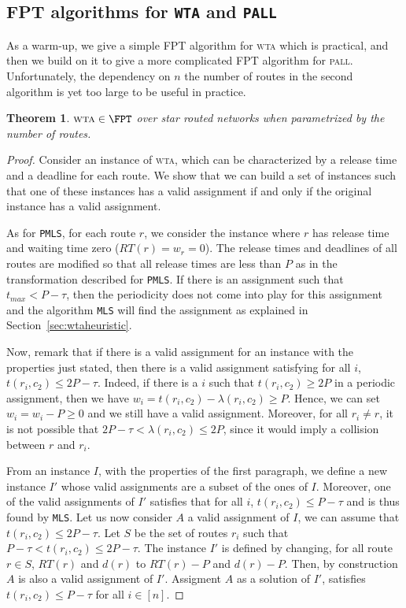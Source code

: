 \documentclass[a4paper,10pt]{article}
\newcommand\MLS{\texttt{MLS}\xspace}
\newcommand\PMLS{\texttt{PMLS}\xspace}
\newtheorem{theorem}{Theorem}
\newcommand\pall{\textsc{pall}\xspace}
\newcommand\wta{\textsc{wta}\xspace}
\begin{document}
\subsection{FPT algorithms for \texttt{WTA} and \texttt{PALL}}

As a warm-up, we give a simple FPT algorithm for \wta which is practical,
and then we build on it to give a more complicated FPT algorithm for \pall. Unfortunately, the dependency on $n$ the number of routes in the second algorithm is yet too large to be useful in practice. 

\begin{theorem}\label{th:braFPT}
$\wta \in \FPT$ over star routed networks when parametrized by the number of routes.
\end{theorem}
\begin{proof}
 Consider an instance of \wta, which can be characterized by a release time and a deadline for each route.
 We show that we can build a set of instances such that one of these instances has a valid assignment if and only if the original instance has a valid assignment.

  As for \PMLS, for each route $r$, we consider the instance where $r$ has release time and waiting time zero ($RT(r) = w_r = 0$). The release times and deadlines of all routes are modified so that all release times are less than $P$ as in the transformation described for \PMLS. If there is an assignment such that $t_{max} < P-\tau$, then the periodicity does not come into play for this assignment and the algorithm \MLS will find the assignment as explained in Section~\ref{sec:wtaheuristic}.

 Now, remark that if there is a valid assignment for an instance with the properties just stated,
 then there is a valid assignment satisfying for all $i$, $t(r_i,c_2) \leq 2P - \tau$.  
 Indeed, if there is a $i$ such that $t(r_i,c_2) \geq 2P$ in a periodic assignment, then we have 
 $w_i = t(r_i,c_2) - \lambda(r_i,c_2) \geq P$. Hence, we can set $w_i = w_i -P \geq 0$ and we still have 
 a valid assignment. Moreover, for all $r_i \neq r$, it is not possible that $2P-\tau < \lambda(r_i,c_2) \leq 2P$, since it would imply a collision between $r$ and $r_i$.
 

From an instance $I$, with the properties of the first paragraph, we define a new instance $I'$ whose valid assignments are a subset of the ones of $I$. Moreover, one of the valid assignments of $I'$ satisfies that for all $i$, $t(r_i,c_2) \leq P - \tau$ and is thus found by \MLS. 
Let us now consider $A$ a valid assignment of $I$, we can assume that $t(r_i,c_2) \leq 2P - \tau$. Let $S$ be the set of routes $r_i$ such that  $P - \tau < t(r_i,c_2) \leq 2P - \tau$. The instance $I'$ is defined by changing, for all route $r \in S$, $RT(r)$ and $d(r)$ to $RT(r) - P$ and $d(r) - P$. Then, by construction $A$ is also a valid assignment of $I'$. Assigment $A$ as a solution of $I'$, satisfies $t(r_i,c_2) \leq P - \tau$ for all $i\in [n]$. 


\end{proof}
\end{document}
